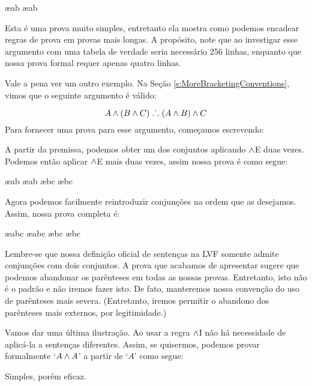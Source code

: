 \begin{fitchproof}
	 \ae{ab}
	 \ae{ab}
	 
\end{fitchproof}

 Esta \'e uma prova muito simples, entretanto ela mostra como podemos encadear regras de  prova em provas mais longas.  A prop\'osito, note que ao investigar esse argumento com uma tabela de verdade seria necess\'ario 256 linhas, enquanto que nossa prova formal requer apenas quatro linhas.

Vale a pena ver um outro exemplo.  Na Se\c c\~ao   \ref{s:MoreBracketingConventions}, vimos  que o seguinte  argumento \'e v\'alido:

	$$A \wedge (B \wedge C) \mathrel{\ldotp\dot{}\,\ldotp} (A \wedge B) \wedge C$$
 Para fornecer uma prova para esse argumento,  come\c camos escrevendo: 
\begin{fitchproof}
\end{fitchproof}
 A partir da premissa, podemos obter um dos conjuntos aplicando $\wedge$E duas vezes. Podemos ent\~ao aplicar $\wedge$E mais duas vezes,  assim nossa prova \'e como segue: 
\begin{fitchproof}
	 \ae{ab}
	 \ae{ab}
	 \ae{bc}
	 \ae{bc}
\end{fitchproof}
 Agora podemos facilmente reintroduzir conjun\c c\~oes na ordem que as desejamos. Assim, nossa prova  completa \'e:
 
\begin{fitchproof}
	 \ae{abc}
	 \ae{abc}
	 \ae{bc}
	 \ae{bc}
\end{fitchproof}
Lembre-se que nossa defini\c c\~ao oficial de senten\c cas na LVF somente admite conjun\c c\~oes com dois conjuntos.  A prova que acabamos de apresentar sugere que podemos abandonar  os par\^enteses em todas as nossas provas. Entretanto, isto n\~ao \'e o padr\~ao e  n\~ao iremos fazer isto.  De fato, manteremos nossa conven\c c\~ao do uso de par\^enteses mais severa. (Entretanto, iremos permitir o abandono dos par\^enteses mais externos, por legitimidade.)  

Vamos dar uma \'ultima ilustra\c c\~ao. Ao usar a regra $\wedge$I 
n\~ao h\'a necessidade de aplic\'a-la a senten\c cas diferentes.
Assim, se quisermos, podemos provar formalmente  `$A \wedge A$' a partir de `$A$' como  segue:
\begin{fitchproof}
\end{fitchproof}
Simples, por\'em eficaz.

